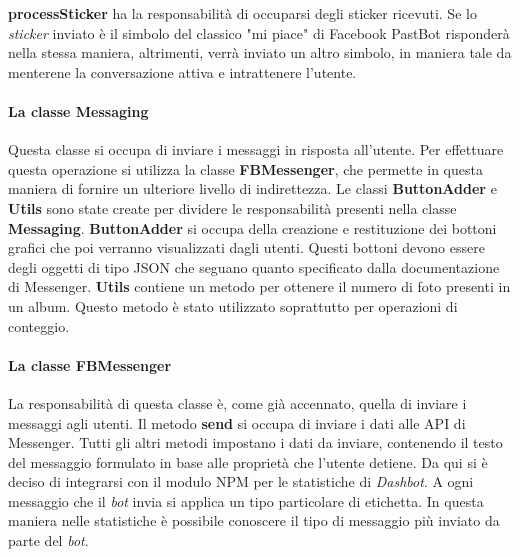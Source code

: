 \textbf{processSticker} ha la responsabilità di occuparsi degli sticker
ricevuti. Se lo \textit{sticker} inviato è il simbolo del classico "mi piace"
di Facebook PastBot risponderà nella stessa maniera, altrimenti, verrà inviato
un altro simbolo, in maniera tale da menterene la conversazione attiva e
intrattenere l'utente.

\paragraph*{La classe Messaging} Questa classe si occupa di inviare i messaggi
in risposta all'utente. Per effettuare questa operazione si utilizza la classe
\textbf{FBMessenger}, che permette in questa maniera di fornire un ulteriore
livello di indirettezza. Le classi \textbf{ButtonAdder} e \textbf{Utils} sono
state create per dividere le responsabilità presenti nella classe
\textbf{Messaging}. \textbf{ButtonAdder} si occupa della creazione e
restituzione dei bottoni grafici che poi verranno visualizzati dagli utenti.
Questi bottoni devono essere degli oggetti di tipo JSON che seguano quanto
specificato dalla documentazione di Messenger.
\textbf{Utils} contiene un metodo per ottenere il numero di foto presenti in un
album. Questo metodo è stato utilizzato soprattutto per operazioni di conteggio.

\paragraph*{La classe FBMessenger} La responsabilità di questa classe è, come
già accennato, quella di inviare i messaggi agli utenti. Il metodo
\textbf{send} si occupa di inviare i dati alle API di Messenger. Tutti gli
altri metodi impostano i dati da inviare, contenendo il testo del messaggio
formulato in base alle proprietà che l'utente detiene. Da qui si è deciso di
integrarsi con il modulo NPM per le statistiche di \textit{Dashbot}. A ogni
messaggio che il \textit{bot} invia si applica un tipo particolare di
etichetta. In questa maniera nelle statistiche è possibile conoscere il tipo di
messaggio più inviato da parte del \textit{bot}.
